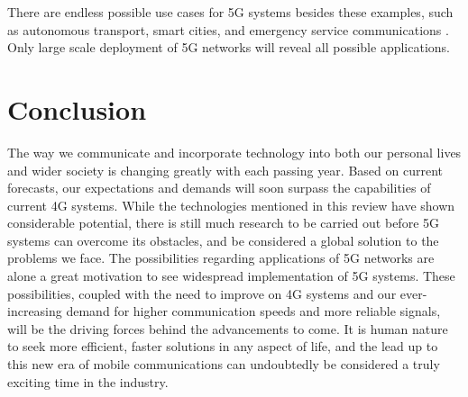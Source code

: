 \documentclass[journal]{IEEEtran}
\begin{document}
There are endless possible use cases for 5G systems besides these examples, such as autonomous transport, smart cities, and emergency service communications \cite{wp5g}. Only large scale deployment of 5G networks will reveal all possible applications.

\section{Conclusion}
The way we communicate and incorporate technology into both our personal lives and wider society is changing greatly with each passing year. Based on current forecasts, our expectations and demands will soon surpass the capabilities of current 4G systems. While the technologies mentioned in this review have shown considerable potential, there is still much research to be carried out before 5G systems can overcome its obstacles, and be considered a global solution to the problems we face. The possibilities regarding applications of 5G networks are alone a great motivation to see widespread implementation of 5G systems. These possibilities, coupled with the need to improve on 4G systems and our ever-increasing demand for higher communication speeds and more reliable signals, will be the driving forces behind the advancements to come. It is human nature to seek more efficient, faster solutions in any aspect of life, and the lead up to this new era of mobile communications can undoubtedly be considered a truly exciting time in the industry.

\printbibliography
\end{document}
